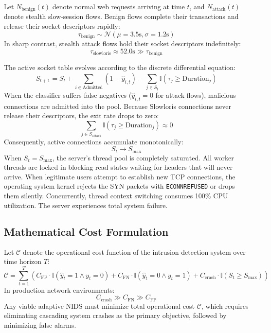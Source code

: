 \documentclass[12pt,a4paper,oneside]{report}
\begin{document}
Let $N_{\text{benign}}(t)$ denote normal web requests arriving at time $t$, and $N_{\text{attack}}(t)$ denote stealth slow-session flows. Benign flows complete their transactions and release their socket descriptors rapidly:
\begin{equation}
\tau_{\text{benign}} \sim \mathcal{N}(\mu = 3.5\text{s}, \sigma = 1.2\text{s})
\end{equation}
In sharp contrast, stealth attack flows hold their socket descriptors indefinitely:
\begin{equation}
\tau_{\text{slowloris}} \approx 52.0\text{s} \gg \tau_{\text{benign}}
\end{equation}

The active socket table evolves according to the discrete differential equation:
\begin{equation}
S_{t+1} = S_t + \sum_{i \in \text{Admitted}} (1 - \hat{y}_{i,t}) - \sum_{j \in S_t} \mathbb{I}(\tau_j \ge \text{Duration}_j)
\end{equation}
When the classifier suffers false negatives ($\hat{y}_{i,t} = 0$ for attack flows), malicious connections are admitted into the pool. Because Slowloris connections never release their descriptors, the exit rate drops to zero:
\begin{equation}
\sum_{j \in S_{\text{attack}}} \mathbb{I}(\tau_j \ge \text{Duration}_j) \approx 0
\end{equation}
Consequently, active connections accumulate monotonically:
\begin{equation}
S_t \longrightarrow S_{\max}
\end{equation}
When $S_t = S_{\max}$, the server's thread pool is completely saturated. All worker threads are locked in blocking read states waiting for headers that will never arrive. When legitimate users attempt to establish new TCP connections, the operating system kernel rejects the SYN packets with \texttt{ECONNREFUSED} or drops them silently. Concurrently, thread context switching consumes 100\% CPU utilization. The server experiences total system failure.

\subsection{Mathematical Cost Formulation}
Let $\mathcal{C}$ denote the operational cost function of the intrusion detection system over time horizon $T$:
\begin{equation}
\mathcal{C} = \sum_{t=1}^T \left( C_{\text{FP}} \cdot \mathbb{I}(\hat{y}_t = 1 \land y_t = 0) + C_{\text{FN}} \cdot \mathbb{I}(\hat{y}_t = 0 \land y_t = 1) + C_{\text{crash}} \cdot \mathbb{I}(S_t \ge S_{\max}) \right)
\end{equation}
In production network environments:
\begin{equation}
C_{\text{crash}} \gg C_{\text{FN}} \gg C_{\text{FP}}
\end{equation}
Any viable adaptive NIDS must minimize total operational cost $\mathcal{C}$, which requires eliminating cascading system crashes as the primary objective, followed by minimizing false alarms.
\end{document}
